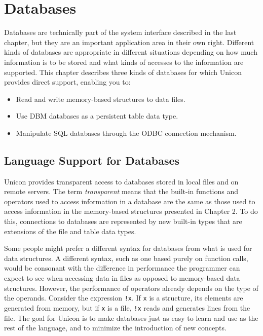 \chapter{Databases}

Databases are technically part of the system interface
described in the last chapter, but they are an important application
area in their own right. Different kinds of databases are
appropriate in different situations depending on how much information is to
be stored and what kinds of accesses to the information are supported.
This chapter describes three kinds of databases for which Unicon
provides direct support, enabling you to:

\begin{itemize}
\item Read and write memory-based structures to data files.
\item Use DBM databases as a persistent table data type.
\item Manipulate SQL databases through the ODBC connection mechanism.
\end{itemize}

\section{Language Support for Databases}

Unicon provides transparent access to databases stored in local files
and on remote servers. The term
{\em transparent\/} means that the built-in
functions and operators used to access information in a database are
the same as those used to access information in the memory-based
structures presented in Chapter 2. To do this, connections to databases
are represented by new built-in types that are extensions of the file
and table data types.

Some people might prefer a different syntax for databases from what is
used for data structures. A different syntax, such as one based purely
on function calls, would be consonant with the difference in
performance the programmer can expect to see when accessing data in
files as opposed to memory-based data structures. However, the
performance of operators already depends on the type of the operands.
Consider the expression \texttt{!x}. If \texttt{x} is a structure, its
elements are generated from memory, but if \texttt{x} is a file,
\texttt{!x} reads and generates lines from the file. The goal for
Unicon is to make databases just as easy to learn and use as the rest
of the language, and to minimize the introduction of new concepts.

